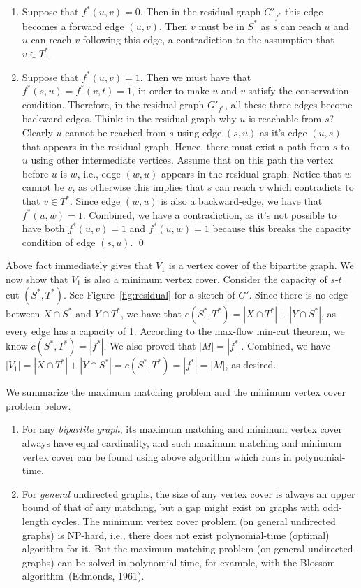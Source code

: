 \begin{enumerate}
\item Suppose that $f^*(u,v) = 0$. Then in the residual graph $G'_{f^*}$ this edge becomes a forward edge $(u,v)$.
Then $v$ must be in $S^*$ as $s$ can reach $u$ and $u$ can reach $v$ following this edge, a contradiction
to the assumption that $v\in T^*$.
\item Suppose that $f^*(u,v) = 1$. Then we must have that $f^*(s,u) = f^*(v,t) = 1$, in order to make $u$ and $v$ satisfy
the conservation condition. Therefore, in the residual graph $G'_{f^*}$, all these three edges become backward edges.
Think: in the residual graph why $u$ is reachable from $s$?
Clearly $u$ cannot be reached from $s$ using edge $(s,u)$ as it's edge $(u,s)$ that appears in the residual graph.
Hence, there must exist a path from $s$ to $u$ using other intermediate vertices.
Assume that on this path the vertex before $u$ is $w$, i.e., edge $(w,u)$ appears in the residual graph.
Notice that $w$ cannot be $v$, as otherwise this implies that $s$ can reach $v$ which contradicts to that $v\in T^*$.
Since edge $(w,u)$ is also a backward-edge, we have that $f^*(u,w) = 1$.
Combined, we have a contradiction, as it's not possible to have both $f^*(u,v) = 1$ and $f^*(u,w) = 1$
because this breaks the capacity condition of edge $(s,u)$. \qed
\end{enumerate}


Above fact immediately gives that $V_1$ is a vertex cover of the bipartite graph.
We now show that $V_1$ is also a minimum vertex cover.
Consider the capacity of $s$-$t$ cut $(S^*, T^*)$. 
See Figure~\ref{fig:residual} for a sketch of $G'$.
Since there is no edge between $X\cap S^*$ and $Y\cap T^*$, we have
that $c(S^*, T^*) = |X\cap T^*| + |Y\cap S^*|$, as every edge has a capacity of 1.
According to the max-flow min-cut theorem, we know 
$c(S^*, T^*) = |f^*|$. We also proved that $|M| = |f^*|$. Combined, 
we have $|V_1| = |X\cap T^*| + |Y\cap S^*| = c(S^*, T^*) = |f^*| = |M|$, as desired.

We summarize the maximum matching problem and the minimum vertex cover problem below.
\vspace*{-\topsep}
\begin{enumerate}
\item For any \emph{bipartite graph}, its maximum matching
and minimum vertex cover always have equal cardinality,
and such maximum matching and minimum vertex cover
can be found using above algorithm which runs in polynomial-time.
\item For \emph{general} undirected graphs, the size of
any vertex cover is always an upper bound of that of any matching,
but a gap might exist on graphs with odd-length cycles.
The minimum vertex cover problem (on general undirected graphs) is NP-hard, i.e., there does not
exist polynomial-time (optimal) algorithm for it.
But the maximum matching problem (on general undirected graphs) can be solved in polynomial-time,
for example, with the Blossom algorithm~(Edmonds, 1961).
\end{enumerate}

